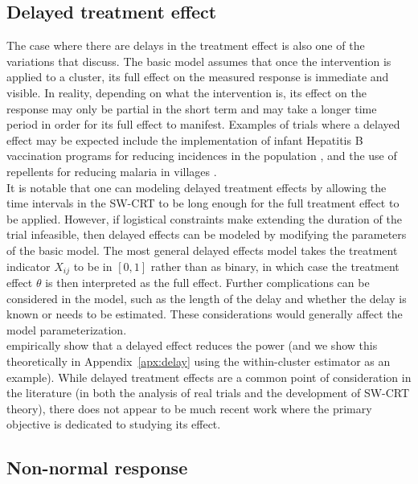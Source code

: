 \documentclass[10pt]{article}
\begin{document}
\subsection{Delayed treatment effect}

The case where there are delays in the treatment effect is also one of the variations that \citeauthor{Hussey:2007} discuss. The basic model assumes that once the intervention is applied to a cluster, its full effect on the measured response is immediate and visible. In reality, depending on what the intervention is, its effect on the response may only be partial in the short term and may take a longer time period in order for its full effect to manifest. Examples of trials where a delayed effect may be expected include the implementation of infant Hepatitis B vaccination programs for reducing incidences in the population \parencite{Hughes:2015}, and the use of repellents for reducing malaria in villages \parencite{Agius:2020}.
\\

It is notable that one can modeling delayed treatment effects by allowing the time intervals in the SW-CRT to be long enough for the full treatment effect to be applied. However, if logistical constraints make extending the duration of the trial infeasible, then delayed effects can be modeled by modifying the parameters of the basic model. The most general delayed effects model takes the treatment indicator $X_{ij}$ to be in $[0,1]$ rather than as binary, in which case the treatment effect $\theta$ is then interpreted as the full effect. Further complications can be considered in the model, such as the length of the delay and whether the delay is known or needs to be estimated. These considerations would generally affect the model parameterization.
\\

\textcite{Hussey:2007} empirically show that a delayed effect reduces the power (and we show this theoretically in Appendix~\ref{apx:delay} using the within-cluster estimator as an example). While delayed treatment effects are a common point of consideration in the literature (in both the analysis of real trials and the development of SW-CRT theory), there does not appear to be much recent work where the primary objective is dedicated to studying its effect.

\subsection{Non-normal response}
\end{document}
